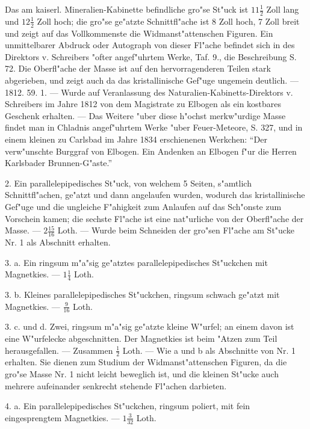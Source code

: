\documentclass[a4paper, 11pt, oneside, polutonikogreek, german]{article}
\begin{document}
\setlength{\leftskip}{0pt}
\setlength{\parindent}{20pt}

Das am kaiserl. Mineralien-Kabinette befindliche gro"se St"uck ist $11\frac{1}{2}$ Zoll lang und $12\frac{1}{2}$ Zoll hoch; die gro"se ge"atzte Schnittfl"ache ist 8 Zoll hoch, 7 Zoll breit und zeigt auf das Vollkommenste die Widmanst"attenschen Figuren. Ein unmittelbarer Abdruck oder Autograph von dieser Fl"ache befindet sich in des Direktors v. Schreibers "ofter angef"uhrtem Werke, Taf. 9., die Beschreibung S. 72. Die Oberfl"ache der Masse ist auf den hervorragenderen Teilen stark abgerieben, und zeigt auch da das kristallinische Gef"uge ungemein deutlich. --- 1812. 59. 1. --- Wurde auf Veranlassung des Naturalien-Kabinetts-Direktors v. Schreibers im Jahre 1812 von dem Magistrate zu Elbogen als ein kostbares Geschenk erhalten. --- Das Weitere "uber diese h"ochst merkw"urdige Masse findet man in Chladnis angef"uhrtem Werke "uber Feuer-Meteore, S. 327, und in einem kleinen zu Carlsbad im Jahre 1834 erschienenen Werkchen: "`Der verw"unschte Burggraf von Elbogen. Ein Andenken an Elbogen f"ur die Herren Karlsbader Brunnen-G"aste."'

2. Ein parallelepipedisches St"uck, von welchem 5 Seiten, s"amtlich Schnittfl"achen, ge"atzt und dann angelaufen wurden, wodurch das kristallinische Gef"uge und die ungleiche F"ahigkeit zum Anlaufen auf das Sch"onste zum Vorschein kamen; die sechste Fl"ache ist eine nat"urliche von der Oberfl"ache der Masse. --- $2\frac{15}{16}$ Loth. --- Wurde beim Schneiden der gro"sen Fl"ache am St"ucke Nr. 1 als Abschnitt erhalten.

3. a. Ein ringsum m"a"sig ge"atztes parallelepipedisches St"uckchen mit Magnetkies. --- $1\frac{1}{4}$ Loth.

3. b. Kleines parallelepipedisches St"uckchen, ringsum schwach ge"atzt mit Magnetkies. --- $\frac{9}{16}$ Loth.

3. c. und d. Zwei, ringsum m"a"sig ge"atzte kleine W"urfel; an einem davon ist eine W"urfelecke abgeschnitten. Der Magnetkies ist beim "Atzen zum Teil herausgefallen. --- Zusammen $\frac{1}{2}$ Loth. --- Wie a und b als Abschnitte von Nr. 1 erhalten. Sie dienen zum Studium der Widmanst"attenschen Figuren, da die gro"se Masse Nr. 1 nicht leicht beweglich ist, und die kleinen St"ucke auch mehrere aufeinander senkrecht stehende Fl"achen darbieten.

4. a. Ein parallelepipedisches St"uckchen, ringsum poliert, mit fein eingesprengtem Magnetkies. --- $1\frac{3}{32}$ Loth.
\end{document}
